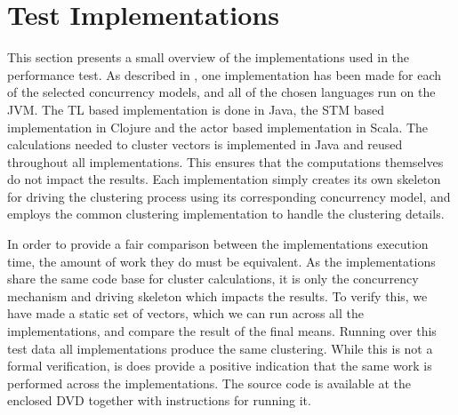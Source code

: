 %

\section{Test Implementations}\label{sec:test_impl}
This section presents a small overview of the implementations used in the performance test. As described in , one implementation has been made for each of the selected concurrency models, and all of the chosen languages run on the \ac{JVM}. The \ac{TL} based implementation is done in Java, the \ac{STM} based implementation in Clojure and the actor based implementation in Scala. The calculations needed to cluster vectors is implemented in Java and reused throughout all implementations. This ensures that the computations themselves do not impact the results. Each implementation simply creates its own skeleton for driving the clustering process using its corresponding concurrency model, and employs the common clustering implementation to handle the clustering details. 

In order to provide a fair comparison between the implementations execution time, the amount of work they do must be equivalent. As the implementations share the same code base for cluster calculations, it is only the concurrency mechanism and driving skeleton which impacts the results. To verify this, we have made a static set of vectors, which we can run across all the implementations, and compare the result of the final means. Running over this test data all implementations produce the same clustering. While this is not a formal verification, is does provide a positive indication that the same work is performed across the implementations. The source code is available at the enclosed DVD together with instructions for running it.
%
